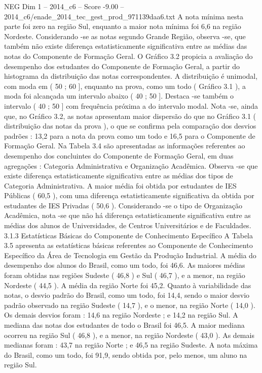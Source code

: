 \begin{textsample}{NEG Dim 1 – 2014\_c6 – Score -9.00 – 2014\_c6/enade\_2014\_tec\_gest\_prod\_971139daa6.txt}
A nota mínima nesta parte foi zero na região Sul, enquanto a maior nota mínima foi 6,6 na região Nordeste.
Considerando -se as notas segundo Grande Região, observa -se, que também não existe diferença estatisticamente significativa entre as médias das notas do Componente de Formação Geral.
O Gráfico 3.2 propicia a avaliação do desempenho dos estudantes do Componente de Formação Geral, a partir do histograma da distribuição das notas correspondentes.
A distribuição é unimodal, com moda em ( 50 ; 60 ], enquanto na prova, como um todo ( Gráfico 3.1 ), a moda foi alcançada um intervalo abaixo ( 40 ; 50 ].
Destaca -se também o intervalo ( 40 ; 50 ] com frequência próxima a do intervalo modal.
Nota -se, ainda que, no Gráfico 3.2, as notas apresentam maior dispersão do que no Gráfico 3.1 ( distribuição das notas da prova ), o que se confirma pela comparação dos desvios padrões : 13,2 para a nota da prova como um todo e 16,5 para o Componente de Formação Geral.
Na Tabela 3.4 são apresentadas as informações referentes ao desempenho dos concluintes do Componente de Formação Geral, em duas agregações : Categoria Administrativa e Organização Acadêmica.
Observa -se que existe diferença estatisticamente significativa entre as médias dos tipos de Categoria Administrativa.
A maior média foi obtida por estudantes de IES Públicas ( 60,5 ), com uma diferença estatisticamente significativa da obtida por estudantes de IES Privadas ( 50,6 ).
Considerando -se o tipo de Organização Acadêmica, nota -se que não há diferença estatisticamente significativa entre as médias dos alunos de Universidades, de Centros Universitários e de Faculdades. 3.1.3 Estatísticas Básicas do Componente de Conhecimento Específico A Tabela 3.5 apresenta as estatísticas básicas referentes ao Componente de Conhecimento Específico da Área de Tecnologia em Gestão da Produção Industrial.
A média do desempenho dos alunos do Brasil, como um todo, foi 46,6.
As maiores médias foram obtidas nas regiões Sudeste ( 46,8 ) e Sul ( 46,7 ), e a menor, na região Nordeste ( 44,5 ).
A média da região Norte foi 45,2.
Quanto à variabilidade das notas, o desvio padrão do Brasil, como um todo, foi 14,4, sendo o maior desvio padrão observado na região Sudeste ( 14,7 ), e o menor, na região Norte ( 14,0 ).
Os demais desvios foram : 14,6 na região Nordeste ; e 14,2 na região Sul.
A mediana das notas dos estudantes de todo o Brasil foi 46,5.
A maior mediana ocorreu na região Sul ( 46,8 ), e a menor, na região Nordeste ( 43,0 ).
As demais medianas foram : 43,7 na região Norte ; e 46,5 na região Sudeste.
A nota máxima do Brasil, como um todo, foi 91,9, sendo obtida por, pelo menos, um aluno na região Sul.

\end{textsample}
